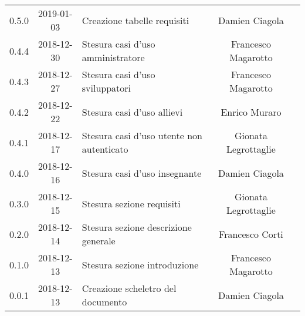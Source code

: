 {\begin{longtable}{ c c C{6cm} c c }
		0.5.0 & 
		2019-01-03 &  
		Creazione tabelle requisiti&	
		Damien Ciagola &	
		\reda{} \\
		
		0.4.4 & 
		2018-12-30 &  
		Stesura casi d'uso amministratore &	
		Francesco Magarotto &	
		\reda{} \\
		
		0.4.3 & 
		2018-12-27 &  
		Stesura casi d'uso sviluppatori &	
		Francesco Magarotto &	
		\reda{} \\
		
		0.4.2 & 
		2018-12-22 &  
		Stesura casi d'uso allievi &	
		Enrico Muraro	&	
		\reda{} \\	
		
		0.4.1 & 
		2018-12-17 &  
		Stesura casi d'uso utente non autenticato &	
		Gionata Legrottaglie &	
		\reda{} \\
		
		0.4.0 & 
		2018-12-16 &  
		Stesura casi d'uso insegnante &	
		Damien Ciagola &	
		\reda{} \\
		
		0.3.0 & 
		2018-12-15 &  
		Stesura sezione requisiti &	
		Gionata Legrottaglie &	
		\reda{} \\
		
		0.2.0 & 
		2018-12-14 &  
		Stesura sezione descrizione generale	&	
		Francesco Corti &
		\reda{} \\
		
		0.1.0 & 
		2018-12-13 &  
		Stesura sezione introduzione &	
		Francesco Magarotto &	
		\reda{}  \\
		
		0.0.1 & 
		2018-12-13 &  
		Creazione scheletro del documento&	
		Damien Ciagola  &	
		\reda{}  \\
	\end{longtable}

}